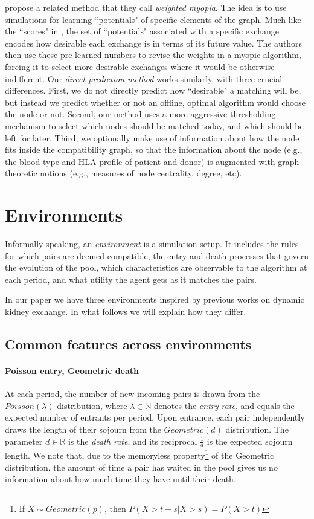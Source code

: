 \documentclass[format=acmsmall, review=false]{acmart}
\begin{document}
\citet{dickerson2012dynamic, dickerson2015futurematch} propose a related method that they call \emph{weighted myopia}. The idea is to use simulations for learning ``potentials" of specific elements of the graph. Much like the ``scores" in \citet{awasthi2009online}, the set of ``potentials" associated with a specific exchange encodes how desirable each exchange is in terms of its future value. The authors then use these pre-learned numbers to revise the weights in a myopic algorithm, forcing it to select more desirable exchanges where it would be otherwise indifferent. Our \emph{direct prediction method} works similarly, with three crucial differences. First, we do not directly predict how ``desirable" a matching will be, but instead we predict whether or not an offline, optimal algorithm would choose the node or not. Second, our method uses a more aggressive thresholding mechanism to select which nodes should be matched today, and which should be left for later. Third, we optionally make use of information about how the node fits inside the compatibility graph, so that the information about the node (e.g., the blood type and HLA profile of patient and donor) is augmented with graph-theoretic notions (e.g., measures of node centrality, degree, etc).



\section{Environments} 

Informally speaking, an \emph{environment} is a simulation setup. It includes the rules for which pairs are deemed compatible, the entry and death processes that govern the evolution of the pool, which characteristics are observable to the algorithm at each period, and what utility the agent gets as it matches the pairs.

In our paper we have three environments inspired by previous works on dynamic kidney exchange. In what follows we will explain how they differ.

\subsection{Common features across environments}

\paragraph{Poisson entry, Geometric death} At each period, the number of new incoming pairs is drawn from the $Poisson(\lambda)$ distribution, where $\lambda \in \mathbb{N}$ denotes the \emph{entry rate}, and equals the expected number of entrants per period. Upon entrance, each pair independently draws the length of their sojourn from the $Geometric(d)$ distribution. The parameter $d \in \mathbb{R}$ is the \emph{death rate}, and its reciprocal $\frac{1}{d}$ is the expected sojourn length. We note that, due to the memoryless property\footnote{If $X \sim Geometric(p)$, then $P(X > t+s | X > s) = P(X > t)$} of the Geometric distribution, the amount of time a pair has waited in the pool gives us no information about how much time they have until their death.
\end{document}
